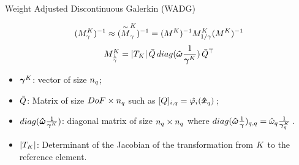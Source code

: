 \begin{frame}{Weight Adjusted Discontinuous Galerkin (WADG)}
  \scriptsize

  \begin{equation}
({M}^{K}_{\gamma})^{-1} \approx ({\overset{\sim}{{M}}}^{K}_{\gamma})^{-1} = ({M}^{K})^{-1} {M}^{K}_{1/{\gamma}} ({M}^{K})^{-1}
\label{inv_wadg}
\end{equation}
\begin{equation}
{M}^{K}_{\frac{1}{{\gamma}}} = |T_{K}| \, {\bar{Q}}\, diag({\boldsymbol{\hat{\omega}}} \frac{1}{{\boldsymbol{\gamma}}^{K}})\, {\bar{Q}}^\top \label{wadg_operator}
\end{equation}


\begin{itemize}
\item ${\boldsymbol{\gamma}}^{K}$: vector of size ${n_q}$;
\item ${\bar{Q}}$: Matrix of size ${DoF} \times {n_q}$ such as $[Q]_{i,q} = \hat{\varphi_i}({\boldsymbol{\hat{x}}}_q)$\,;
\item $diag({\boldsymbol{\hat{\omega}}} \frac{1}{{\boldsymbol{\gamma}}^{K}})$: diagonal matrix of size ${n_q} \times {n_q}$ where $diag({\boldsymbol{\hat{\omega}}} \frac{1}{{\boldsymbol{\gamma}}})_{q,q} = {\hat{\omega}}_q \frac{1}{{\boldsymbol{\gamma}}^{K}_q}$\,.
\item $|T_{K}|$: Determinant of the Jacobian of the transformation from ${K}$ to the reference element.
\end{itemize}

\end{frame}


